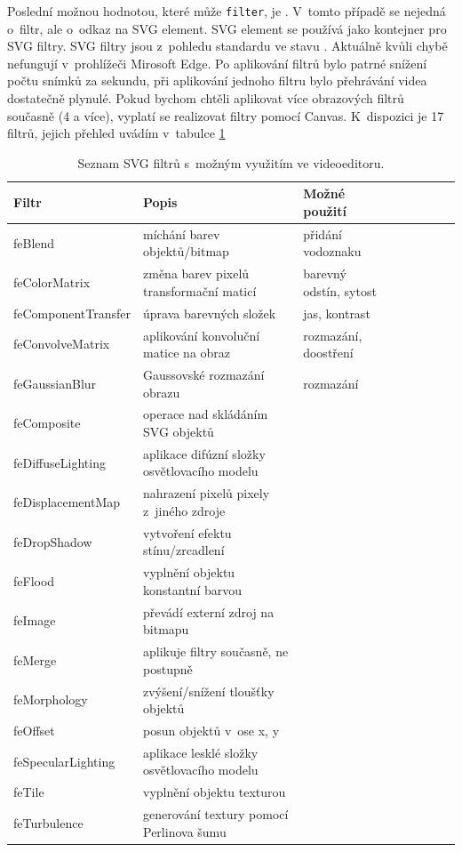 Poslední možnou hodnotou, které může \texttt{filter}, je . V~tomto případě se nejedná o~filtr, ale o~odkaz na SVG element. SVG element se používá jako kontejner pro SVG filtry. SVG filtry jsou z~pohledu standardu ve stavu . Aktuálně kvůli chybě nefungují v~prohlížeči Mirosoft Edge. Po aplikování filtrů bylo patrné snížení počtu snímků za sekundu, při aplikování jednoho filtru bylo přehrávání videa dostatečně plynulé. Pokud bychom chtěli aplikovat více obrazových filtrů současně (4 a více), vyplatí se realizovat filtry pomocí Canvas. K~dispozici je 17 filtrů, jejich přehled uvádím v~tabulce \ref{tab:svg}

\begin{table}[h]
    \centering
    \begin{tabular}{|l|l|l|l|l|l|l|l|}
    \hline
    Filtr   & Popis & Možné použití \\
    \hline
    feBlend & míchání barev objektů/bitmap & přidání vodoznaku \\
    feColorMatrix & změna barev pixelů transformační maticí & barevný odstín, sytost \\
    feComponentTransfer & úprava barevných složek & jas, kontrast \\
    feConvolveMatrix & aplikování konvoluční matice na obraz & rozmazání, doostření \\
    feGaussianBlur & Gaussovské rozmazání obrazu & rozmazání \\
    feComposite & operace nad skládáním SVG objektů & \\
    feDiffuseLighting & aplikace difúzní složky osvětlovacího modelu & \\
    feDisplacementMap & nahrazení pixelů pixely z~jiného zdroje & \\
    feDropShadow & vytvoření efektu stínu/zrcadlení & \\
    feFlood & vyplnění objektu konstantní barvou & \\
    feImage & převádí externí zdroj na bitmapu & \\
    feMerge & aplikuje filtry současně, ne postupně & \\
    feMorphology & zvýšení/snížení tloušťky objektů & \\
    feOffset & posun objektů v~ose x, y & \\
    feSpecularLighting & aplikace lesklé složky osvětlovacího modelu & \\
    feTile & vyplnění objektu texturou & \\
    feTurbulence & generování textury pomocí Perlinova šumu & \\

    \hline
    \end{tabular}
    \caption{Seznam SVG filtrů s~možným využitím ve videoeditoru.}
    \label{tab:svg}
\end{table}
